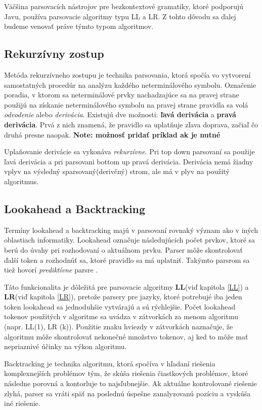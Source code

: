 Väčšina parsovacích nástrojov pre bezkontextové gramatiky, ktoré podporujú Javu, používa parsovacie algoritmy typu LL a LR. Z tohto dôvodu sa ďalej budeme venovať práve týmto typom algoritmov.

\subsection{Rekurzívny zostup}\label{recursive-descent}
Metóda rekurzívneho zostupu je technika parsovania, ktorá spočía vo vytvorení samostatných procedúr na analýzu každého neterminálového symbolu. \cite{CVUT:program_language} Označenie poradia, v ktorom sa neterminálové prvky nachadzajúce sa na pravej strane použijú na získanie neterminálového symbolu na pravej strane pravidla sa volá \textit{odvodenie} alebo \textit{derivácia}. Existujú dve možnosti: \textbf{ľavá derivácia} a \textbf{pravá derivácia}. Prvá z nich znamená, že pravidlo sa uplatňuje zľava doprava, začiaľ čo druhá presne naopak. 
\textbf{Note: možnosť pridať príklad ak je nutné}

Uplaňovanie derivácie sa vykonáva \textit{rekurzívne}. Pri top down parsovaní sa použije ľavá derivácia a pri parsovani bottom up pravá derivácia. Derivácia nemá žiadny vplyv na výsledný sparsovaný(derivčný) strom, ale má v plyv na použitý algoritmus.

\subsection{Lookahead a Backtracking}
Termíny lookahead a backtracking majú v parsovaní rovnaký význam ako v iných oblastiach informatiky. Lookahead označuje následujúcich počet prvkov, ktoré sa berú do úvahy pri rozhodovaní o aktuálnom prvku. Parser môže skontrolovať ďalší token a rozhodnúť sa, ktoré pravidlo sa má uplatniť. Takýmto parsrom sa tiež hovorí \textit{prediktívne} parsre \cite{haberman:parsing_demystified}.

Táto funkcionalita je dôležitá pre parsovacie algoritmy \textbf{LL}(viď kapitola \ref{LL}) a \textbf{LR}(viď kapitola \ref{LR}), pretože parsery pre jazyky, ktoré potrebujé iba jeden token lookahead sa jednoduhšie vytvárajú a sú rýchlejšie. Počet lookahead tokenov použitých v algoritme sa uvádza v zátvorkách za menom algoritmu (napr. LL(1), LR (k)). Použitie znaku hviezdy v zátvorkách naznačuje, že algoritmu môže skontrolovať nekonečné množstvo tokenov, aj ked to môže mať nepriaznivé účinky na výkon algoritmu.\cite{tomassetti:parsing}

Backtracking je technika algoritmu, ktorá spočíva v hľadaní riešenia komplexnejších problémov tým, že skúša riešenia čiastkových problémov, ktoré následne porovná a kontorluje to najsľubnejšie. Ak aktuálne kontrolované riešenie zlyhá, parser sa vráti späť na poslednú úspešne zanalyzovanú pozíciu a vyskúša iné riešenie.

